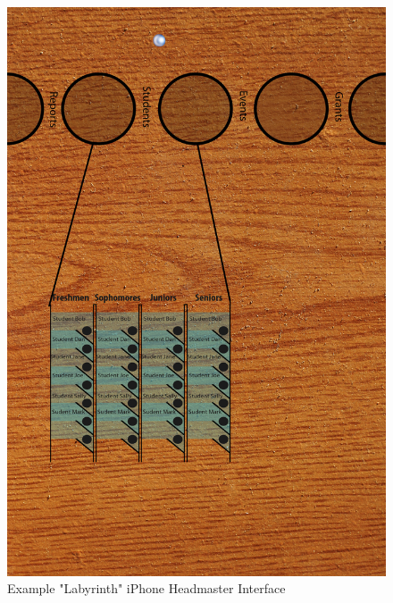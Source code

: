 \documentclass{article}
\begin{document}
\begin{figure}[ht!]
\centering
\includegraphics[width=140mm]{labyrinth-start.jpg}
\caption{Example "Labyrinth" iPhone Headmaster Interface}
\label{overflow}
\end{figure}
\end{document}
